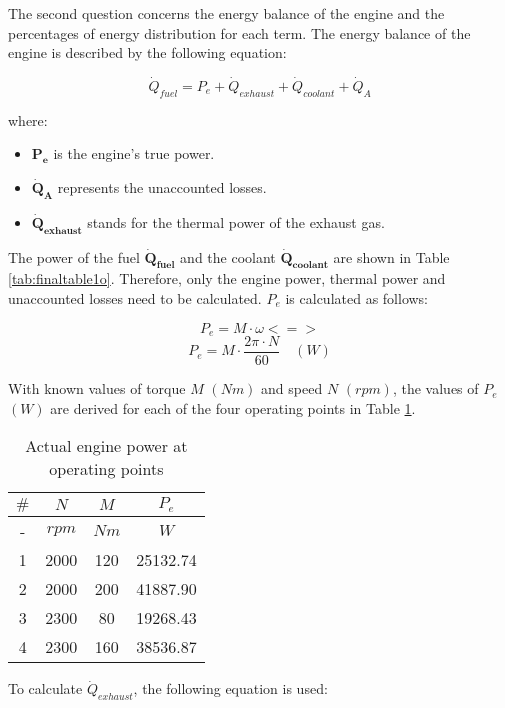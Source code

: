 \documentclass{report}
\begin{document}
The second question concerns the energy balance of the engine and the percentages of energy distribution for each term. The energy balance of the engine is described by the following equation:

\begin{equation}
    \label{eq:energisol}
    \dot{Q}_{fuel}=P_e+\dot{Q}_{exhaust}+\dot{Q}_{coolant}+\dot{Q}_A
\end{equation}

where:
\begin{itemize}
    \item $\boldsymbol{P_{e}}$ is the engine's true power.
    \item $\boldsymbol{\dot{Q}_A}$ represents the unaccounted losses.
    \item $\boldsymbol{\dot{Q}_{exhaust}}$ stands for the thermal power of the exhaust gas.
\end{itemize}

The power of the fuel $\boldsymbol{\dot{Q}_{fuel}}$ and the coolant $\boldsymbol{\dot{Q}_{coolant}}$ are shown in Table \ref{tab:finaltable1o}. Therefore, only the engine power, thermal power and unaccounted losses need to be calculated. $P_e$ is calculated as follows:

$$P_e=M\cdot \omega<=>$$
$$P_e=M\cdot \frac{2\pi \cdot N}{60}\quad (W)$$

With known values of torque $M$ $(Nm)$ and speed $N$ $(rpm)$, the values of $P_e$ $(W)$ are derived for each of the four operating points in Table \ref{tab:Pe}.

\begin{table}[h]
    \centering
    \renewcommand{\arraystretch}{1.2} 
    \begin{tabular}{|c|c|c|c|}
    \hline
    \rowcolor{blue}
    $\#$ & $N$ & $M$ & $P_{e}$\\
    \hline
    \rowcolor{gray}
    - & $rpm$ & $Nm$ & $W$\\
    \hline
    1 & 2000 & 120 & 25132.74\\
    \hline
    2 & 2000 & 200 & 41887.90 \\
    \hline
    3 & 2300 & 80 & 19268.43\\
    \hline
    4 & 2300 & 160 & 38536.87\\
    \hline 
    \end{tabular}
    \caption{Actual engine power at operating points}
    \label{tab:Pe}
\end{table}

To calculate $\dot{Q}_{exhaust}$, the following equation is used:
\end{document}
